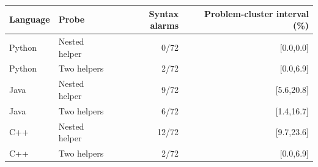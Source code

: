 \begin{tabular}{@{}llrr@{}}
\toprule
Language & Probe & Syntax alarms & Problem-cluster interval (\%) \\
\midrule
Python & Nested helper & 0/72 & [0.0,0.0] \\
Python & Two helpers & 2/72 & [0.0,6.9] \\
Java & Nested helper & 9/72 & [5.6,20.8] \\
Java & Two helpers & 6/72 & [1.4,16.7] \\
C++ & Nested helper & 12/72 & [9.7,23.6] \\
C++ & Two helpers & 2/72 & [0.0,6.9] \\
\bottomrule
\end{tabular}
